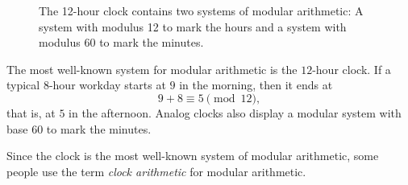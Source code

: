 \begin{figure}[t]
  \centering
  \caption[The 12-hour clock]{The 12-hour clock contains two systems of modular arithmetic: A system with modulus 12 to mark the hours and a system with modulus 60 to mark the minutes.}
  \label{figure:clock}
\end{figure}

\begin{example}
  The most well-known system for modular arithmetic is the $12$-hour clock. If a typical $8$-hour workday starts at $9$ in the morning, then it ends at
  \begin{equation*}
    9+8\equiv 5\pmod{12},
  \end{equation*}
  that is, at $5$ in the afternoon. Analog clocks also display a modular system with base $60$ to mark the minutes.

  Since the clock is the most well-known system of modular arithmetic, some people use the term \emph{clock arithmetic} for modular arithmetic.
\end{example}

